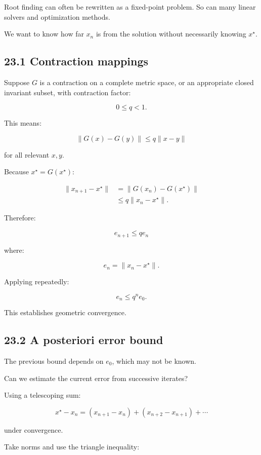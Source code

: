 Root finding can often be rewritten as a fixed-point problem. So can many linear solvers and optimization methods.

We want to know how far \(x_n\) is from the solution without necessarily knowing \(x^\star\).

\subsection{23.1 Contraction mappings}\label{02-foundations-ii-ch028-contraction-mappings}

Suppose \(G\) is a contraction on a complete metric space, or an appropriate closed invariant subset, with contraction factor:

\[ 0\le q<1. \]

This means:

\[ \boxed{ \|G(x)-G(y)\| \le q\|x-y\| } \]

for all relevant \(x,y\).

Because \(x^\star=G(x^\star)\):

\[ \begin{aligned} \|x_{n+1}-x^\star\| &= \|G(x_n)-G(x^\star)\|\\ &\le q\|x_n-x^\star\|. \end{aligned} \]

Therefore:

\[ \boxed{ e_{n+1}\le qe_n } \]

where:

\[ e_n=\|x_n-x^\star\|. \]

Applying repeatedly:

\[ \boxed{ e_n\le q^ne_0 }. \]

This establishes geometric convergence.

\subsection{23.2 A posteriori error bound}\label{02-foundations-ii-ch028-a-posteriori-error-bound}

The previous bound depends on \(e_0\), which may not be known.

Can we estimate the current error from successive iterates?

Using a telescoping sum:

\[ x^\star-x_n = (x_{n+1}-x_n) + (x_{n+2}-x_{n+1}) +\cdots \]

under convergence.

Take norms and use the triangle inequality:

